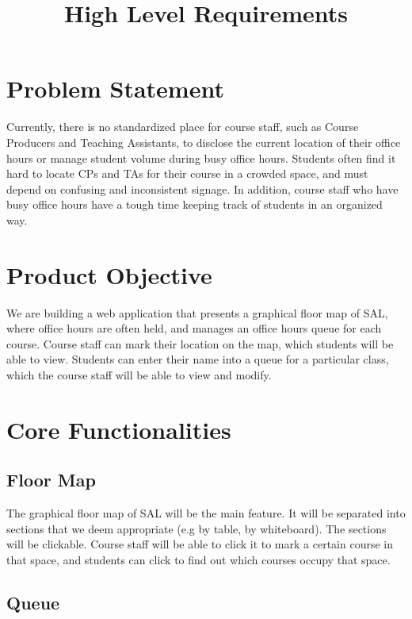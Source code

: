 \documentclass{article}
\title{High Level Requirements}
\date{\vspace{-10ex}}
\begin{document}
\maketitle

\section*{Problem Statement}

Currently, there is no standardized place for course staff, such as Course Producers and Teaching Assistants, to disclose the current location of their office hours or manage student volume during busy office hours. Students often find it hard to locate CPs and TAs for their course in a crowded space, and must depend on confusing and inconsistent signage. In addition, course staff who have busy office hours have a tough time keeping track of students in an organized way.

\section*{Product Objective}

We are building a web application that presents a graphical floor map of SAL, where office hours are often held, and manages an office hours queue for each course. Course staff can mark their location on the map, which students will be able to view. Students can enter their name into a queue for a particular class, which the course staff will be able to view and modify.

\section*{Core Functionalities}

\subsection*{Floor Map}

The graphical floor map of SAL will be the main feature. It will be separated into sections that we deem appropriate (e.g by table, by whiteboard). The sections will be clickable. Course staff will be able to click it to mark a certain course in that space, and students can click to find out which courses occupy that space.

\subsection*{Queue}
\end{document}
